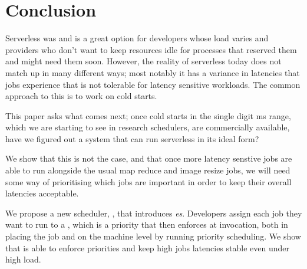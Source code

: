 \section{Conclusion}


Serverless was and is a great option for developers whose load varies and
providers who don't want to keep resources idle for processes that reserved
them and might need them soon. However, the reality of serverless today does
not match up in many different ways; most notably it has a variance in
latencies that jobs experience that is not tolerable for latency sensitive
workloads. The common approach to this is to work on cold starts. 

This paper asks what comes next; once cold starts in the single digit ms
range, which we are starting to see in research schedulers, are commercially
available, have we figured out a system that can run serverless in its ideal
form?

We show that this is not the case, and that once more latency senstive jobs
are able to run alongside the usual map reduce and image resize jobs, we
will need some way of prioritising which jobs are important in order to keep
their overall latencies acceptable.

We propose a new scheduler, \sys{}, that introduces \emph{\priceclass{}es}.
Developers assign each job they want to run to a \priceclass{}, which is a
priority that \sys{} then enforces at invocation, both in placing the job
and on the machine level by running priority scheduling. We show that \sys{}
is able to enforce priorities and keep high \class{} jobs latencies stable
even under high load.